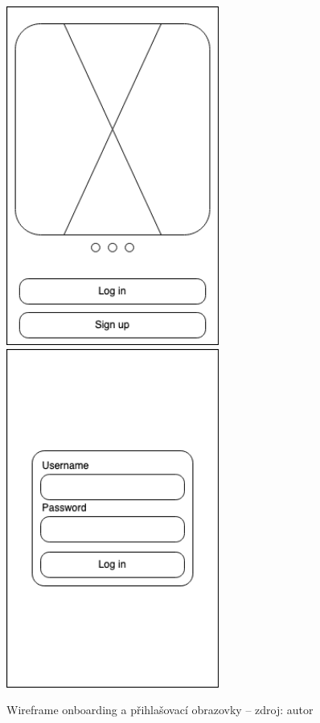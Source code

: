 \begin{figure}[H]
	\begin{center}
		\includegraphics[width=70mm]{img/wf_onboarding.png}
		\includegraphics[width=70mm]{img/wf_login.png}
	\end{center}
	\caption[Wireframe přihlášení a onboarding obrazovky]{Wireframe onboarding a přihlašovací obrazovky -- zdroj: autor}
\end{figure}

